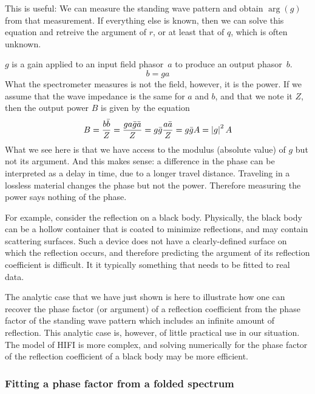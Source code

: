 This is useful:
We can measure the standing wave pattern and obtain $\arg(g)$ from that measurement.
If everything else is known, then we can solve this equation and retreive the argument of $r$, or at least that of $q$, which is often unknown.

$g$ is a gain applied to an input field phasor~$a$ to produce an output phasor~$b$.
\begin{equation}
    b = g a
\end{equation}
What the spectrometer measures is not the field, however, it is the power.
If we assume that the wave impedance is the same for $a$ and $b$, and that we note it $Z$, then the output power $B$ is given by the equation
\begin{equation}
    B
    = \frac{b \bar{b}}{Z}
    = \frac{g a \bar{g} \bar{a}}{Z}
    = g\bar{g} \frac{a \bar{a}}{Z}
    = g\bar{g} A
    = \left| g \right|^2 A
\end{equation}
What we see here is that we have access to the modulus (absolute value) of $g$ but not its argument.
And this makes sense: a difference in the phase can be interpreted as a delay in time, due to a longer travel distance.
Traveling in a lossless material changes the phase but not the power.
Therefore measuring the power says nothing of the phase.

For example, consider the reflection on a black body.
Physically, the black body can be a hollow container that is coated to minimize reflections, and may contain scattering surfaces.
Such a device does not have a clearly-defined surface on which the reflection occurs, and therefore predicting the argument of its reflection coefficient is difficult.
It it typically something that needs to be fitted to real data.

The analytic case that we have just shown is here to illustrate how one can recover the phase factor (or argument) of a reflection coefficient from the phase factor of the standing wave pattern which includes an infinite amount of reflection.
This analytic case is, however, of little practical use in our situation.
The model of HIFI is more complex, and solving numerically for the phase factor of the reflection coefficient of a black body may be more efficient.


\subsubsection{Fitting a phase factor from a folded spectrum}

